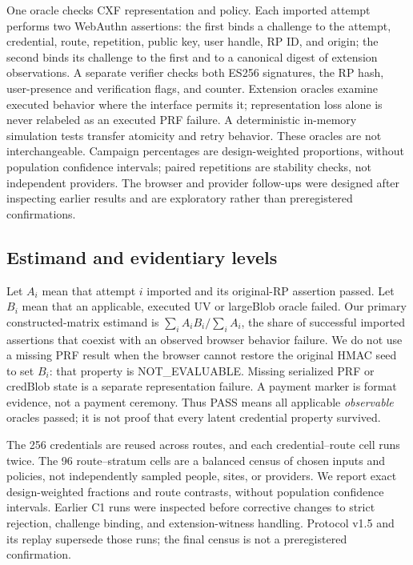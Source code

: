 \documentclass[letterpaper,twocolumn,10pt]{article}
\begin{document}
One oracle checks CXF representation and policy. Each imported attempt
performs two WebAuthn assertions: the first binds a challenge to the attempt,
credential, route, repetition, public key, user handle, RP ID, and origin;
the second binds its challenge to the first and to a canonical digest of
extension observations. A separate verifier checks both ES256 signatures,
the RP hash, user-presence and verification flags, and counter. Extension
oracles examine executed behavior where the
interface permits it; representation loss alone is never relabeled as an
executed PRF failure. A deterministic in-memory simulation tests transfer
atomicity and retry behavior. These oracles are not interchangeable.
Campaign percentages are design-weighted proportions, without population
confidence intervals; paired repetitions are stability checks, not
independent providers. The browser and provider
follow-ups were designed after inspecting earlier results and are
exploratory rather than preregistered confirmations.

\subsection{Estimand and evidentiary levels}
Let $A_i$ mean that attempt $i$ imported and its original-RP assertion
passed. Let $B_i$ mean that an applicable, executed UV or largeBlob oracle
failed. Our primary constructed-matrix estimand is
$\sum_i A_iB_i/\sum_i A_i$, the share of successful imported assertions
that coexist with an observed browser behavior failure. We do not use a
missing PRF result when the browser cannot restore the original HMAC seed
to set $B_i$: that property is NOT\_EVALUABLE. Missing serialized PRF or
credBlob state is a separate representation failure. A payment marker is
format evidence, not a payment ceremony. Thus PASS means all applicable
\emph{observable} oracles passed; it is not proof that every latent
credential property survived.

The 256 credentials are reused across routes, and each credential--route
cell runs twice. The 96 route--stratum cells are a balanced census of
chosen inputs and policies, not independently sampled people, sites, or
providers. We report exact design-weighted fractions and route contrasts,
without population confidence intervals. Earlier C1 runs were inspected
before corrective changes to strict rejection, challenge binding, and
extension-witness handling. Protocol v1.5 and its replay supersede those
runs; the final census is not a preregistered confirmation.
\end{document}
